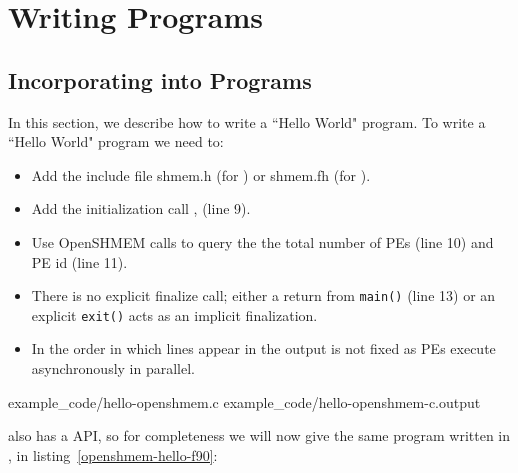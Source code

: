 \clearpage

\appendix

\pagestyle{fancy} \withlinenumbers
\fancyhf{}
\fancyhead[RE, LO]{\leftmark}
\fancyhead[RO, LE]{\thepage}
\fancyfoot[CE,CO]{\thepage}
\renewcommand{\headrulewidth}{0pt}




\chapter{Writing \openshmem Programs}
\section*{Incorporating \openshmem{} into Programs}\label{sec:writing_programs}

In this section, we describe how to write a ``Hello World" \openshmem program.
To write a ``Hello World" \openshmem program we need to: 

\begin{itemize}
\item Add the include file shmem.h (for \Clang) or shmem.fh (for \Fortran).
\item Add the initialization call , (line 9).
\item Use OpenSHMEM calls to query the the total number of PEs (line 10) and PE
    id (line 11).
\item There is no explicit finalize call; either a return from \texttt{main()}
    (line 13) or an explicit \texttt{exit()} acts as an implicit \openshmem
    finalization.
\item In \openshmem the order in which lines appear in the output is not fixed
    as \ac{PE}s execute asynchronously in parallel.
\end{itemize}

\begin{minipage}{\linewidth}
\vspace{0.1in}
                {example_code/hello-openshmem.c}
                {example_code/hello-openshmem-c.output}
\vspace{0.1in}
\end{minipage}

\openshmem also has a \Fortran{} API, so for completeness we will now give the
same program written in \Fortran, in listing~\ref{openshmem-hello-f90}:

